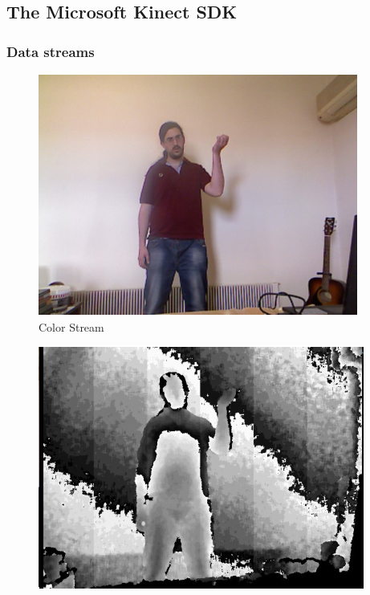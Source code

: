 \subsection{The Microsoft Kinect SDK}


\begin{frame}
\frametitle{Data streams}

\begin{figure}[ht!]
  \centering
  \begin{minipage}{0.32\textwidth}
  	\centering
    \includegraphics[width=\textwidth]{figs/color-frame}\\
    Color Stream
  \end{minipage}\hfill
  \begin{minipage}{0.32\textwidth}
  	\centering
	\includegraphics[width=\textwidth]{figs/depth-frame}\\

\end{minipage}
\end{figure}
\end{frame}
